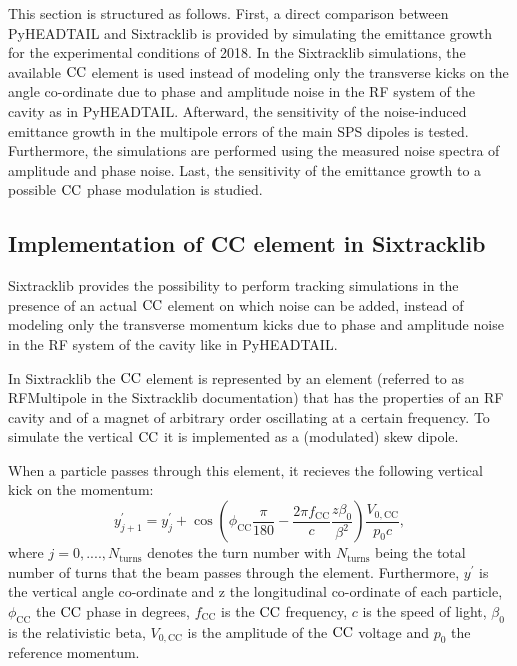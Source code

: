 This section is structured as follows. First, a direct comparison between PyHEADTAIL and Sixtracklib is provided by simulating the emittance growth for the experimental conditions of 2018. In the Sixtracklib simulations, the available ${\mathrm{CC}}$ element is used instead of modeling only the transverse kicks on the angle co-ordinate due to phase and amplitude noise in the RF system of the cavity as in PyHEADTAIL. Afterward, the sensitivity of the noise-induced emittance growth in the multipole errors of the main SPS dipoles is tested. Furthermore, the simulations are performed using the measured noise spectra of amplitude and phase noise. Last, the sensitivity of the emittance growth to a possible ${\mathrm{CC}}$ phase modulation is studied.

\subsection{Implementation of CC element in Sixtracklib}\label{subsec:sixtracklig_CC_implementation}
Sixtracklib provides the possibility to perform tracking simulations in the presence of an actual ${\mathrm{CC}}$ element on which noise can be added, instead of modeling only the transverse momentum kicks due to phase and amplitude noise in the RF system of the cavity like in PyHEADTAIL.

In Sixtracklib the ${\mathrm{CC}}$ element is represented by an element (referred to as RFMultipole in the Sixtracklib documentation) that has the properties of an RF cavity and of a magnet of arbitrary order oscillating at a certain frequency. To simulate the vertical ${\mathrm{CC}}$ it is implemented as a (modulated) skew dipole.

When a particle passes through this element, it recieves the following vertical kick on the momentum:
\begin{equation}\label{eq:CC_kick_sixtracklib_vertical}
    y^\prime_{j+1} = y^\prime_{j} + \cos{\left ( \phi_\mathrm{CC} \frac{\pi}{180} - \frac{2\pi f_\mathrm{CC}}{c} \frac{z \beta_0}{\beta^2} \right )} \frac{V_\mathrm{0,CC}}{p_0 c},
\end{equation}
where $j={0, ...., N_\mathrm{turns}}$ denotes the turn number with $N_\mathrm{turns}$ being the total number of turns that the beam passes through the element. Furthermore, $y^\prime$ is the vertical angle co-ordinate and z the longitudinal co-ordinate of each particle, $\phi_\mathrm{CC}$ the ${\mathrm{CC}}$ phase in degrees, $f_\mathrm{CC}$ is the ${\mathrm{CC}}$ frequency, $c$ is the speed of light, $\beta_0$ is the relativistic beta, $V_\mathrm{0,CC}$ is the amplitude of the ${\mathrm{CC}}$ voltage and $p_0$ the reference momentum.


